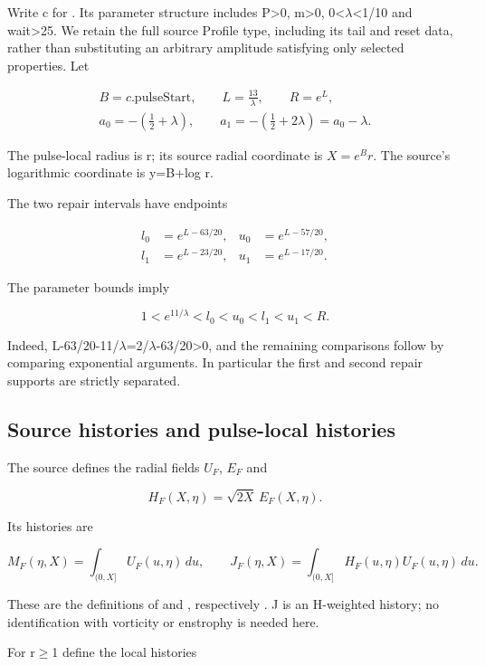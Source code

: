 \documentclass[11pt,a4paper]{article}
\begin{document}
Write c for . Its parameter structure includes P>0, m>0, 0<\ensuremath{\lambda}<1/10 and wait>25. We retain the full source Profile type, including its tail and reset data, rather than substituting an arbitrary amplitude satisfying only selected properties. Let

\[
\begin{gathered}
B=c.\mathrm{pulseStart},\qquad L=\frac{13}{\lambda},\qquad R=e^L,\\
a_0=-\left(\frac12+\lambda\right),\qquad a_1=-\left(\frac12+2\lambda\right)=a_0-\lambda.
\end{gathered} \tag{2.1}
\]

The pulse-local radius is r; its source radial coordinate is \(X=e^B r\). The source's logarithmic coordinate is y=B+log r.

The two repair intervals have endpoints

\[
\begin{aligned}
l_0&=e^{L-63/20},&u_0&=e^{L-57/20},\\
l_1&=e^{L-23/20},&u_1&=e^{L-17/20}.
\end{aligned} \tag{2.2}
\]

The parameter bounds imply

\[
1<e^{11/\lambda}<l_0<u_0<l_1<u_1<R. \tag{2.3}
\]

Indeed, L-63/20-11/\ensuremath{\lambda}=2/\ensuremath{\lambda}-63/20>0, and the remaining comparisons follow by comparing exponential arguments. In particular the first and second repair supports are strictly separated.

\subsection{Source histories and pulse-local histories}

The source defines the radial fields \(U_F\), \(E_F\) and

\[
H_F(X,\eta)=\sqrt{2X}\,E_F(X,\eta).
\]

Its histories are

\[
M_F(\eta,X)=\int_{(0,X]}U_F(u,\eta)\,du,\qquad
J_F(\eta,X)=\int_{(0,X]}H_F(u,\eta)U_F(u,\eta)\,du. \tag{2.4}
\]

These are the definitions of  and , respectively \cite{ref1}. J is an H-weighted history; no identification with vorticity or enstrophy is needed here.

For r\ensuremath{\ge}1 define the local histories
\end{document}
